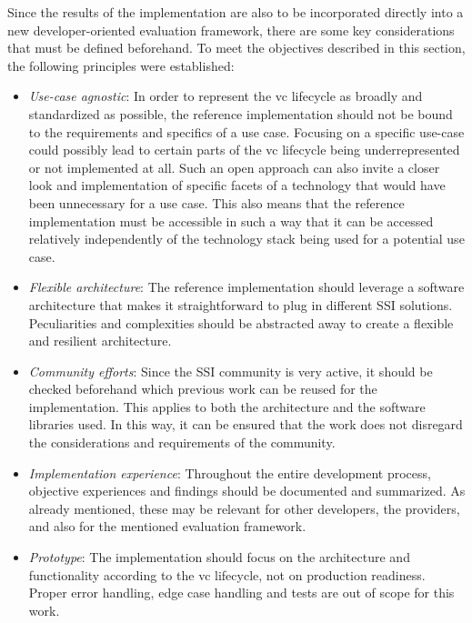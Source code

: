     Since the results of the implementation are also to be incorporated directly into a new developer-oriented evaluation framework, there are some key considerations that must be defined beforehand. To meet the objectives described in this section, the following principles were established:
    \begin{itemize}
        \item \textit{Use-case agnostic}: In order to represent the \ac{vc} lifecycle as broadly and standardized as possible, the reference implementation should not be bound to the requirements and specifics of a use case. Focusing on a specific use-case could possibly lead to certain parts of the \ac{vc} lifecycle being underrepresented or not implemented at all. Such an open approach can also invite a closer look and implementation of specific facets of a technology that would have been unnecessary for a use case. This also means that the reference implementation must be accessible in such a way that it can be accessed relatively independently of the technology stack being used for a potential use case.
        \item \textit{Flexible architecture}: The reference implementation should leverage a software architecture that makes it straightforward to plug in different \ac{SSI} solutions. Peculiarities and complexities should be abstracted away to create a flexible and resilient architecture. 
        \item \textit{Community efforts}: Since the \ac{SSI} community is very active, it should be checked beforehand which previous work can be reused for the implementation. This applies to both the architecture and the software libraries used. In this way, it can be ensured that the work does not disregard the considerations and requirements of the community.
        \item \textit{Implementation experience}: Throughout the entire development process, objective experiences and findings should be documented and summarized. As already mentioned, these may be relevant for other developers, the providers, and also for the mentioned evaluation framework.
        \item \textit{Prototype}: The implementation should focus on the architecture and functionality according to the \ac{vc} lifecycle, not on production readiness. Proper error handling, edge case handling and tests are out of scope for this work.
    \end{itemize}
    
